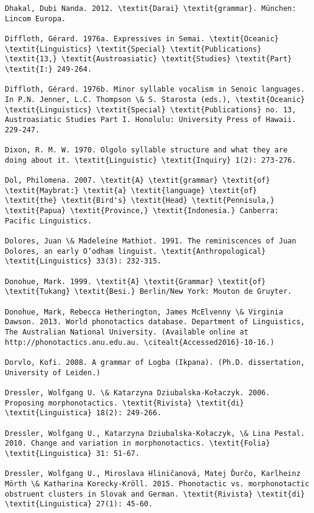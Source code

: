 \begin{verbatim}
Dhakal, Dubi Nanda. 2012. \textit{Darai} \textit{grammar}. München: Lincom Europa.

Diffloth, Gérard. 1976a. Expressives in Semai. \textit{Oceanic} \textit{Linguistics} \textit{Special} \textit{Publications} \textit{13,} \textit{Austroasiatic} \textit{Studies} \textit{Part} \textit{I:} 249-264.

Diffloth, Gérard. 1976b. Minor syllable vocalism in Senoic languages. In P.N. Jenner, L.C. Thompson \& S. Starosta (eds.), \textit{Oceanic} \textit{Linguistics} \textit{Special} \textit{Publications} no. 13, Austroasiatic Studies Part I. Honolulu: University Press of Hawaii. 229-247.

Dixon, R. M. W. 1970. Olgolo syllable structure and what they are doing about it. \textit{Linguistic} \textit{Inquiry} 1(2): 273-276.

Dol, Philomena. 2007. \textit{A} \textit{grammar} \textit{of} \textit{Maybrat:} \textit{a} \textit{language} \textit{of} \textit{the} \textit{Bird's} \textit{Head} \textit{Pennisula,} \textit{Papua} \textit{Province,} \textit{Indonesia.} Canberra: Pacific Linguistics.

Dolores, Juan \& Madeleine Mathiot. 1991. The reminiscences of Juan Dolores, an early O’odham linguist. \textit{Anthropological} \textit{Linguistics} 33(3): 232-315.

Donohue, Mark. 1999. \textit{A} \textit{Grammar} \textit{of} \textit{Tukang} \textit{Besi.} Berlin/New York: Mouton de Gruyter.

Donohue, Mark, Rebecca Hetherington, James McElvenny \& Virginia Dawson. 2013. World phonotactics database. Department of Linguistics, The Australian National University. (Available online at http://phonotactics.anu.edu.au. \citealt{Accessed2016}-10-16.)

Dorvlo, Kofi. 2008. A grammar of Logba (Ikpana). (Ph.D. dissertation, University of Leiden.)

Dressler, Wolfgang U. \& Katarzyna Dziubalska-Kołaczyk. 2006. Proposing morphonotactics. \textit{Rivista} \textit{di} \textit{Linguistica} 18(2): 249-266.

Dressler, Wolfgang U., Katarzyna Dziubalska-Kołaczyk, \& Lina Pestal. 2010. Change and variation in morphonotactics. \textit{Folia} \textit{Linguistica} 31: 51-67.

Dressler, Wolfgang U., Miroslava Hliničanová, Matej Ďurčo, Karlheinz Mörth \& Katharina Korecky-Kröll. 2015. Phonotactic vs. morphonotactic obstruent clusters in Slovak and German. \textit{Rivista} \textit{di} \textit{Linguistica} 27(1): 45-60.


\end{verbatim}
